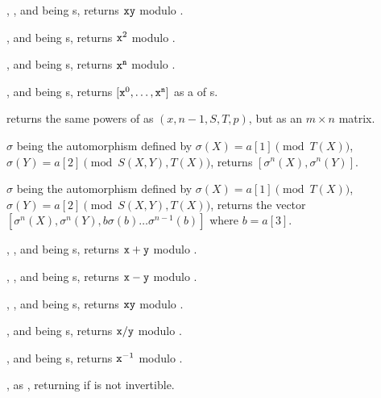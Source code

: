 , ,  and
 being s, returns $\kbd{x}\*\kbd{y}$ modulo .

,  and
 being s, returns ${\tt x}^2$ modulo .

,  and
 being s, returns ${\tt x}^{\tt n}$ modulo .

,  and
 being s, returns $[{\tt x}^0, \dots, {\tt x}^{\tt n}]$ as a
 of s.

returns the same powers of  as $(x, n-1,S, T, p)$,
but as an $m\times n$ matrix.

$\sigma$ being the automorphism defined by $\sigma(X)=a[1]\pmod{T(X)}$,
$\sigma(Y)=a[2]\pmod{S(X,Y),T(X)}$, returns $[\sigma^n(X),\sigma^n(Y)]$.

$\sigma$ being the automorphism defined by $\sigma(X)=a[1]\pmod{T(X)}$,
$\sigma(Y)=a[2]\pmod{S(X,Y),T(X)}$, returns the vector
$[\sigma^n(X),\sigma^n(Y),b\sigma(b)\ldots\sigma^{n-1}(b)]$
where $b=a[3]$.


, ,  and
 being s, returns ${\tt x} + {\tt y}$ modulo .

, ,  and
 being s, returns ${\tt x} - {\tt y}$ modulo .

, ,  and
 being s, returns $\kbd{x}\*\kbd{y}$ modulo .

,  and
 being s, returns ${\tt x}/{\tt y}$ modulo .

,  and
 being s, returns ${\tt x}^{-1}$ modulo .

 , as ,
returning  if  is not invertible.

